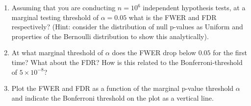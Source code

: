 \documentclass{pset}
\begin{document}
\begin{enumerate}
\item Assuming that you are conducting $n=10^6$ independent hypothesis tests, at a marginal testing threshold of $\alpha = 0.05$ what is the FWER and FDR respectively?  (Hint: consider the distribution of null p-values as Uniform and properties of the Bernoulli distribution to show this analytically).

\item At what marginal threshold of $\alpha$ does the FWER drop below $0.05$ for the first time? What about the FDR? How is this related to the Bonferroni-threshold of $5\times 10^{-8}$? 

\item Plot the FWER and FDR as a function of the marginal p-value threshold $\alpha$ and indicate the Bonferroni threshold on the plot as a vertical line.

\end{enumerate}
\end{document}
